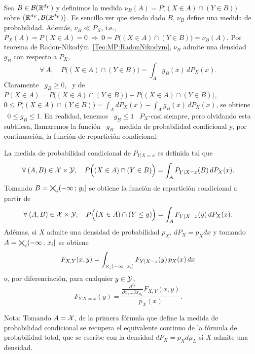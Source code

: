 Sea $B  \in \mathcal{B}(\mathbb{R}^{d_Y})$ y definimos  la medida $\nu_B(A) =  P\Big( \left( X
  \in A \right)  \cap \left( Y \in B \right) \Big)$  sobre $\left( \mathbb{R}^{d_Y} ,
  \mathcal{B}(\mathbb{R}^{d_Y}) \right)$.  Es sencillo ver que siendo dado $B$, $\nu_B$ define
una medida de  probabilidad. Adem\'as, $\nu_B \ll P_X$, i.e.,  $P_X(A) = P(X \in
A) = 0 \: \Rightarrow \: 0 = P\Big(  (X \in A) \cap (Y \in B) \Big) = \nu_B(A)$.
Por  teorema de  Radon-Nikod\'ym~\ref{Teo:MP:RadonNikodym},  $\nu_B$ admite  una
densidad $g_B$ con respecto a $P_X$,
%
\[
\forall \: A, \quad P\Big( (X \in A)  \cap (Y \in B) \Big) = \int_A g_B(x) \,
dP_X(x).
\]
%
Claramente \ $g_B \ge 0$, \ y de \ $P(X \in A) = P\Big( (X \in A) \cap (Y \in B)
\Big) + P\Big( (X \in A) \cap  (Y \in B) \Big)$, \ie $\displaystyle 0 \le P\Big(
(X \in A) \cap (Y \in B) \Big)  = \int_A dP_X(x) - \int_A g_B(x) \, dP_X(x)$, se
obtiene \ $0  \le g_B \le 1$.  En  realidad, tenemos \ $g_B \le  1$ \ $P_X$-casi
siempre, pero olvidando esta subtilesa, llamaremos la funci\'on \ $g_B$ \ medida
de probabilidad condicional y, por continuaci\'on, la funci\'on de repartici\'on
condicional:
%
\begin{definicion}
\label{Def:MP:MedidaCondicional}
%
  La medida de probabilidad condicional de $P_{Y|X=x}$ es definida tal que
  \[
  \forall \: (A,B) \in \mathcal{X} \times \mathcal{Y},  \quad P\Big( (X \in A) \cap (Y \in B) \Big)
  = \int_A P_{Y|X=x}(B) \, dP_X(x).
  \]
  Tomando $B  = \operatorname*{\bigtimes}_i  (-\infty \, ; \, y_i]$  se obtiene la  funci\'on de
  repartici\'on condicional a partir de
  \[
  \forall \: (A,B) \in \mathcal{X} \times \mathcal{Y}, \quad P\Big( (X \in A) \cap (Y \le y) \Big) =
  \int_A F_{Y|X=x}(y) \, dP_X(x).
  \]
  Ad\'emas, si $X$ admite una densidad  de probabilidad $p_X$, $dP_X = p_X dx$ y
  tomando $A = \operatorname*{\bigtimes}_i (-\infty \, ; \, x_i]$ se obtiene
  \[
  F_{X,Y}(x,y) = \int_{\operatorname*{\bigtimes}_i (-\infty \, ; \, x_i]} F_{Y|X=x}(y) \, p_X(x)
  \, dx
  \]
  o, por diferenciaci\'on, para cualquier $y \in \mathcal{Y}$,
  \[
  F_{Y|X=x}(y)   =  \frac{\frac{\partial^{d_X}}{\partial  x_1   \ldots  \partial
      x_{d_X}} F_{X,Y}(x,y)}{p_X(x)}.
  \]
\end{definicion}
%
\noindent Nota: Tomando  $A = \mathcal{X}$, de la primera f\'ormula  que define la medida
de probabilidad condicional se recupera  el equivalente continuo de la f\'ormula
de probabilidad total, que se escribe con la densidad $dP_X = p_X d\mu_L$ si $X$
admite una densidad.

